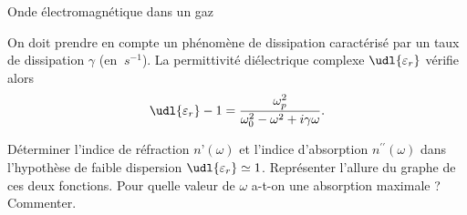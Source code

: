 \begin{exo}[PC][3][colle]{Onde électromagnétique dans un gaz}
\begin{quest}
    \end{quest}
    On doit prendre en compte un phénomène de dissipation caractérisé par un taux de dissipation $\gamma$ (en $\SI{}{s^{-1}}$). La permittivité diélectrique complexe $\udl{\varepsilon_r}$ vérifie  alors
    $$
    \udl{\varepsilon_r} - 1 = \frac{\omega_p^2}{\omega_0^2-\omega^2 + i\gamma \omega}.
    $$
    \begin{quest}
      \item	Déterminer l’indice de réfraction $n’(\omega)$ et l’indice d’absorption $n^{\prime \prime}(\omega)$ dans l’hypothèse de faible dispersion $\udl{\varepsilon_r} \simeq 1$. Représenter l'allure du graphe de ces deux fonctions. Pour quelle valeur de $\omega$ a-t-on une absorption maximale ? Commenter.
    \end{quest}
\end{exo}


